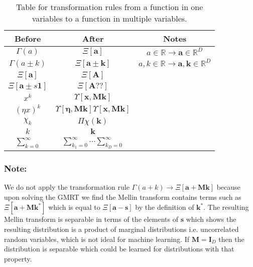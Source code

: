 \documentclass[journal=jcisd8,manuscript=article,layout=onecolumn,pdftex,floatfix,amsmath,amssymb,10pt]{achemso}
\begin{document}
\begin{table}
\begin{tabular}{|c|c|c|}
\hline
Before & After & Notes \\
\hline
$\Gamma(a)$ & $\Xi[\mathbf{a}]$ & $a \in \mathbb{R} \to \mathbf{a} \in \mathbb{R}^D$\\
$\Gamma(a \pm k)$ & $\Xi[\mathbf{a}\pm \mathbf{k}]$ & $a,k \in \mathbb{R} \to \mathbf{a},\mathbf{k} \in \mathbb{R}^D$\\
$\Xi[\mathbf{a}]$ & $\Xi[\mathbf{A}]$ & \\
$\Xi[\mathbf{a}\pm s \mathbf{1}]$ & $\Xi[\mathbf{A} ??]$ & \\
\hline
$x^k$ & $\Upsilon[\mathbf{x},\mathbf{Mk}]$ & \\
$(\eta x)^k$ & $\Upsilon[\boldsymbol\eta,\mathbf{Mk}]\Upsilon[\mathbf{x},\mathbf{Mk}]$ & \\
\hline
$\chi_k$ & $\Pi\chi(\mathbf{k})$ & \\
$k$ & $\mathbf{k}$ & \\
$\sum_{k=0}^\infty$ & $\sum_{k_1=0}^\infty \cdots \sum_{k_D=0}^\infty$ & \\
\hline
\end{tabular}
\caption{Table for transformation rules from a function in one variables to a function in multiple variables.}
\end{table}

\subsubsection{Note:}
We do not apply the transformation rule $\Gamma(a+k) \to \Xi[\mathbf{a} + \mathbf{Mk}]$ because upon solving the GMRT we find the Mellin transform contains terms such as $\Xi[\mathbf{a} + \mathbf{Mk^*}]$ which is equal to $\Xi[\mathbf{a} - \mathbf{s}]$ by the definition of $\mathbf{k}^*$. The resulting Mellin transform is separable in terms of the elements of $\mathbf{s}$ which shows the resulting distribution is a product of marginal distributions i.e. uncorrelated random variables, which is not ideal for machine learning. If $\mathbf{M}=\mathbf{I}_D$ then the distribution is separable which could be learned for distributions with that property.
\end{document}
